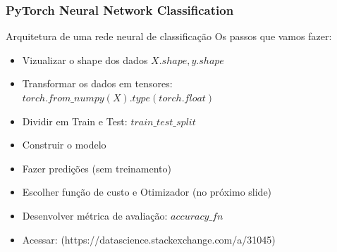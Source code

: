 \documentclass{beamer}
\begin{document}
\begin{frame}
	\frametitle{PyTorch Neural Network Classification}
	\begin{block}{Arquitetura de uma rede neural de classificação}
		Os passos que vamos fazer:
		\begin{itemize}
			\item Vizualizar o shape dos dados $X.shape, y.shape$
			\item Transformar os dados em tensores: $torch.from\_numpy(X).type(torch.float)$
			\item Dividir em Train e Test: $train\_test\_split$
			\item Construir o modelo
			\item Fazer predições (sem treinamento)
			\item Escolher função de custo e Otimizador (no próximo slide)
			\item Desenvolver métrica de avaliação: $accuracy\_fn$
			\item Acessar: (https://datascience.stackexchange.com/a/31045)
		\end{itemize}
	\end{block}
\end{frame}
\end{document}
